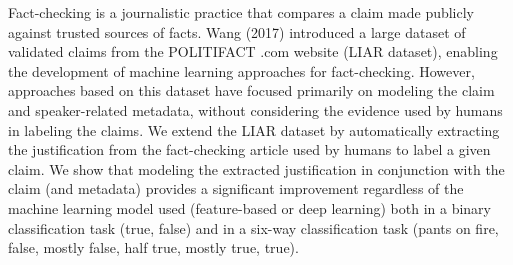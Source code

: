 Fact-checking is a journalistic practice that compares a claim made publicly against trusted sources of facts. Wang (2017) introduced a large dataset of validated claims from the POLITIFACT .com website (LIAR dataset), enabling the development of machine learning approaches for fact-checking. However, approaches based on this dataset have focused primarily on modeling the claim and speaker-related metadata, without considering the evidence used by humans in labeling the claims. We extend the LIAR dataset by automatically extracting the justification from the fact-checking article used by humans to label a given claim. We show that modeling the extracted justification in conjunction with the claim (and metadata) provides a significant improvement regardless of the machine learning model used (feature-based or deep learning) both in a binary classification task (true, false) and in a six-way classification task (pants on fire, false, mostly false, half true, mostly true, true).
